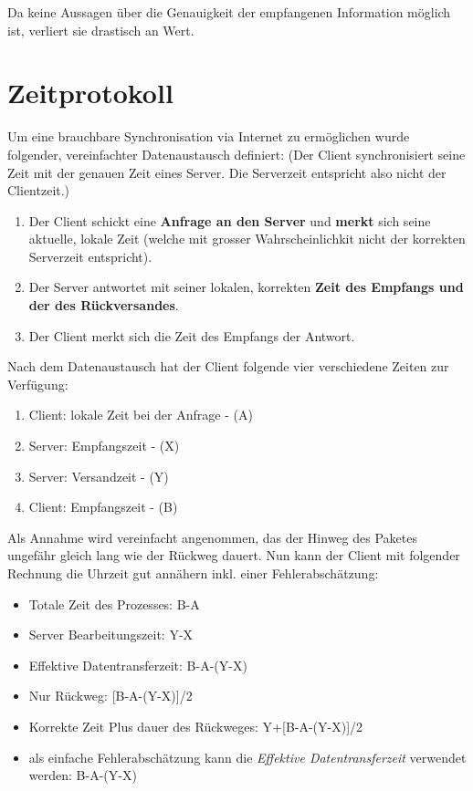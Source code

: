 Da keine Aussagen über die Genauigkeit der empfangenen Information möglich ist, verliert sie drastisch an Wert.

\section{Zeitprotokoll}
Um eine brauchbare Synchronisation via Internet zu ermöglichen wurde folgender, vereinfachter Datenaustausch definiert: (Der Client synchronisiert seine Zeit mit der genauen Zeit eines Server. Die Serverzeit entspricht also nicht der Clientzeit.)\cite{ntp_stackoverfow}

\begin{enumerate}
\item Der Client schickt eine \textbf{Anfrage an den Server} und \textbf{merkt} sich seine aktuelle, lokale Zeit (welche mit grosser Wahrscheinlichkit nicht der korrekten Serverzeit entspricht).
\item Der Server antwortet mit seiner lokalen, korrekten \textbf{Zeit des Empfangs und der des Rückversandes}.
\item Der Client merkt sich die Zeit des Empfangs der Antwort. 
\end{enumerate}
\vspace{1em}
Nach dem Datenaustausch hat der Client folgende vier verschiedene Zeiten zur Verfügung:
\begin{enumerate}
\item Client: lokale Zeit bei der Anfrage - (A)
\item Server: Empfangszeit - (X)
\item Server: Versandzeit - (Y)
\item Client: Empfangszeit - (B)
\end{enumerate}
\vspace{1em}
Als Annahme wird vereinfacht angenommen, das der Hinweg des Paketes ungefähr gleich lang wie der Rückweg dauert.
\vspace{1em}
Nun kann der Client mit folgender Rechnung die Uhrzeit gut annähern inkl. einer Fehlerabschätzung:
\begin{itemize}
\item Totale Zeit des Prozesses: B-A
\item Server Bearbeitungszeit: Y-X
\item Effektive Datentransferzeit: B-A-(Y-X)
\item Nur Rückweg: [B-A-(Y-X)]/2
\item Korrekte Zeit Plus dauer des Rückweges: Y+[B-A-(Y-X)]/2
\item als einfache Fehlerabschätzung kann die \textit{Effektive Datentransferzeit} verwendet werden: B-A-(Y-X)
\end{itemize}

